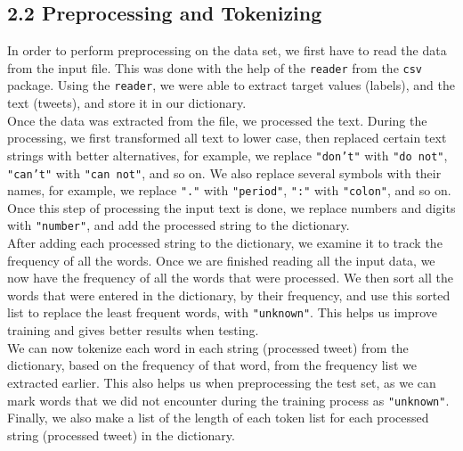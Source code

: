 
\subsection*{2.2 Preprocessing and Tokenizing}


In order to perform preprocessing on the data set, we first have to read the data from the input file. This was done with the help of the \texttt{reader} from the \texttt{csv} package. Using the \texttt{reader}, we were able to extract target values (labels), and the text (tweets), and store it in our dictionary. \\

Once the data was extracted from the file, we processed the text. During the processing, we first transformed all text to lower case, then replaced certain text strings with better alternatives, for example, we replace \texttt{"don't"} with \texttt{"do not"}, \texttt{"can't"} with \texttt{"can not"}, and so on. We also replace several symbols with their names, for example, we replace \texttt{"."} with \texttt{"period"}, \texttt{":"} with \texttt{"colon"}, and so on. Once this step of processing the input text is done, we replace numbers and digits with \texttt{"number"}, and add the processed string to the dictionary. \\

After adding each processed string to the dictionary, we examine it to track the frequency of all the words. Once we are finished reading all the input data, we now have the frequency of all the words that were processed. We then sort all the words that were entered in the dictionary, by their frequency, and use this sorted list to replace the least frequent words, with \texttt{"unknown"}. This helps us improve training and gives better results when testing.\\

We can now tokenize each word in each string (processed tweet) from the dictionary, based on the frequency of that word, from the frequency list we extracted earlier. This also helps us when preprocessing the test set, as we can mark words that we did not encounter during the training process as \texttt{"unknown"}. Finally, we also make a list of the length of each token list for each processed string (processed tweet) in the dictionary.